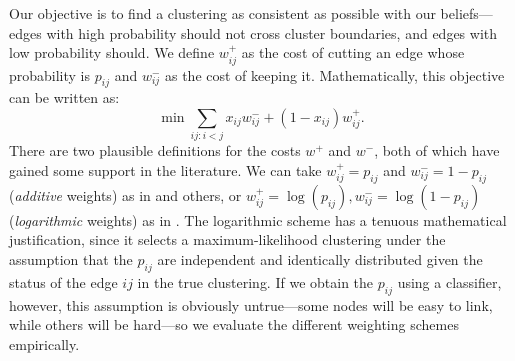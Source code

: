 \documentclass[11pt]{article}
\begin{document}
Our objective is to find a clustering as consistent as possible with
our beliefs---edges with high probability should not cross cluster
boundaries, and edges with low probability should. We define $w^+_{ij}$ as
the cost of cutting an edge whose probability is $p_{ij}$ and
$w^-_{ij}$ as the cost of keeping it. Mathematically, this objective
can be written \cite{Ailon08,Finkel08} as:
\begin{equation}
\min \sum_{ij:i<j} x_{ij}w^-_{ij} + (1 - x_{ij})w^+_{ij}.
\end{equation}
There are two plausible definitions for the costs $w^+$ and $w^-$,
both of which have gained some support in the literature. We can take
$w^+_{ij} = p_{ij}$ and $w^-_{ij} = 1 - p_{ij}$ ({\em additive}
weights) as in \cite{Ailon08} and others, or $w^+_{ij} = \log(p_{ij}),
w^-_{ij} = \log(1 - p_{ij})$ ({\em logarithmic} weights) as in
\cite{Finkel08}. The logarithmic scheme has a tenuous mathematical justification, since it selects a maximum-likelihood
clustering under the assumption that the $p_{ij}$ are independent and
identically distributed given the status of the edge $ij$ in the true
clustering. If we obtain the $p_{ij}$ using a classifier, however,
this assumption is obviously untrue---some nodes will be easy to link,
while others will be hard---so we evaluate the different weighting
schemes empirically.


\end{document}
